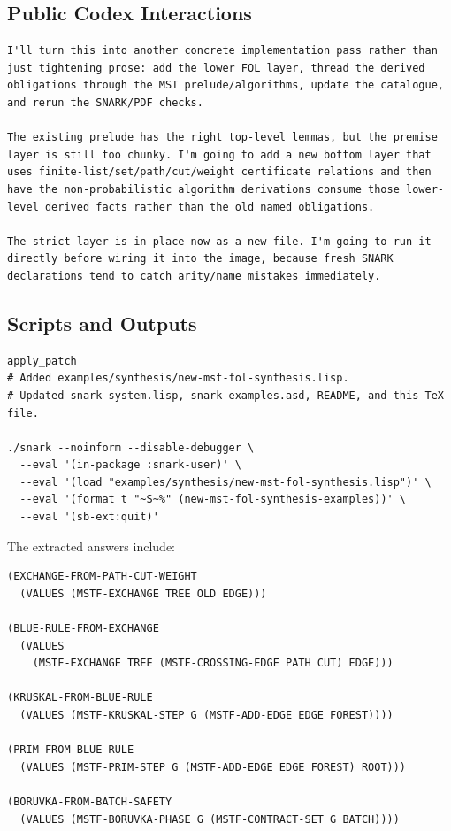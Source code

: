\documentclass[runningheads]{llncs}
\begin{document}
\subsection{Public Codex Interactions}

\begin{lstlisting}
I'll turn this into another concrete implementation pass rather than just tightening prose: add the lower FOL layer, thread the derived obligations through the MST prelude/algorithms, update the catalogue, and rerun the SNARK/PDF checks.

The existing prelude has the right top-level lemmas, but the premise layer is still too chunky. I'm going to add a new bottom layer that uses finite-list/set/path/cut/weight certificate relations and then have the non-probabilistic algorithm derivations consume those lower-level derived facts rather than the old named obligations.

The strict layer is in place now as a new file. I'm going to run it directly before wiring it into the image, because fresh SNARK declarations tend to catch arity/name mistakes immediately.
\end{lstlisting}

\subsection{Scripts and Outputs}

\begin{lstlisting}
apply_patch
# Added examples/synthesis/new-mst-fol-synthesis.lisp.
# Updated snark-system.lisp, snark-examples.asd, README, and this TeX file.

./snark --noinform --disable-debugger \
  --eval '(in-package :snark-user)' \
  --eval '(load "examples/synthesis/new-mst-fol-synthesis.lisp")' \
  --eval '(format t "~S~%" (new-mst-fol-synthesis-examples))' \
  --eval '(sb-ext:quit)'
\end{lstlisting}
The extracted answers include:
\begin{lstlisting}
(EXCHANGE-FROM-PATH-CUT-WEIGHT
  (VALUES (MSTF-EXCHANGE TREE OLD EDGE)))

(BLUE-RULE-FROM-EXCHANGE
  (VALUES
    (MSTF-EXCHANGE TREE (MSTF-CROSSING-EDGE PATH CUT) EDGE)))

(KRUSKAL-FROM-BLUE-RULE
  (VALUES (MSTF-KRUSKAL-STEP G (MSTF-ADD-EDGE EDGE FOREST))))

(PRIM-FROM-BLUE-RULE
  (VALUES (MSTF-PRIM-STEP G (MSTF-ADD-EDGE EDGE FOREST) ROOT)))

(BORUVKA-FROM-BATCH-SAFETY
  (VALUES (MSTF-BORUVKA-PHASE G (MSTF-CONTRACT-SET G BATCH))))
\end{lstlisting}
\end{document}
